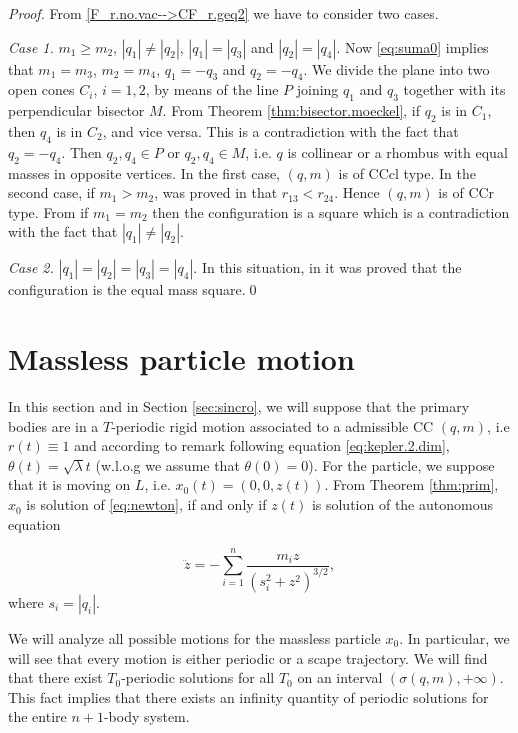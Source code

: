 \documentclass[smallcondensed]{svjour3}
\begin{document}
\begin{proof}
From \eqref{F_r.no.vac-->CF_r.geq2} we have to consider two cases.

\emph{Case 1.}  $m_1\geq m_2$, $|q_1|\neq|q_2|$, $|q_1|=|q_3|$ and $|q_2|=|q_4|$. Now \eqref{eq:suma0} implies that
 $m_1=m_3$, $m_2=m_4$, $q_1=-q_3$ and $q_2=-q_4$.  We divide the plane into two open cones $C_i$, $i=1,2$, by means of  the line $P$ joining $q_1$  and $q_3$ together with its perpendicular bisector $M$.  From Theorem \ref{thm:bisector.moeckel}, if  $q_2$  is in $C_1$, then  $q_4$ is in $C_2$, and vice versa. This is a contradiction with the fact that $q_2=-q_4$. Then $q_2,q_4\in P$ or $q_2,q_4\in M$, i.e. $q$ is collinear or a rhombus with equal masses in opposite vertices. In the first case, $(q,m)$ is of  CCcl type. In the second case, if $m_1>m_2$,   was proved in \cite[Eqs. $(3.44)$ and $(3.45)$]{long2002four} that $r_{13}<r_{24}$. Hence $(q,m)$ is of  CCr type. From \cite[Corollary 2]{perez2007convex} if $m_1=m_2$ then the configuration is a square which is a contradiction with the fact that $|q_1|\neq|q_2|$.

\emph{Case 2.} $|q_1|=|q_2|=|q_3|=|q_4|$. In this situation,   in \cite{hampton2005co} it was proved that the configuration is the equal mass square.\qed
\end{proof}

\section{Massless particle motion}\label{sec:mas-mot}

In this section and in Section \ref{sec:sincro},  we will suppose that the primary bodies are in a $T$-periodic rigid motion associated to a admissible  CC $(q,m)$, i.e  $r(t)\equiv 1$ and according to remark following equation \eqref{eq:kepler.2.dim}, $\theta (t)=\sqrt{\lambda}t$  (w.l.o.g  we  assume that $\theta(0)=0$). For the particle, we suppose that it is moving on $L$, i.e. $x_0(t)=(0,0,z(t))$. From Theorem \ref{thm:prim}, $x_0$ is solution of \eqref{eq:newton}, if and only if $z(t)$ is solution of the autonomous equation



\begin{equation}\label{eq:eq_new_red}
 \ddot{z}=-\sum_{i=1}^n\frac{m_iz}{(s_i^2+z^2)^{3/2}},
\end{equation}
where $s_i=|q_i|$.

We will analyze all possible motions for the massless particle $x_0$. In particular, we will see that every motion is either periodic or a scape trajectory. We will find that there exist $T_0$-periodic solutions for all $T_0$ on an interval  $(\sigma(q,m),+\infty)$. This fact implies that there exists an infinity quantity of periodic solutions for the entire $n+1$-body system.
\end{document}
